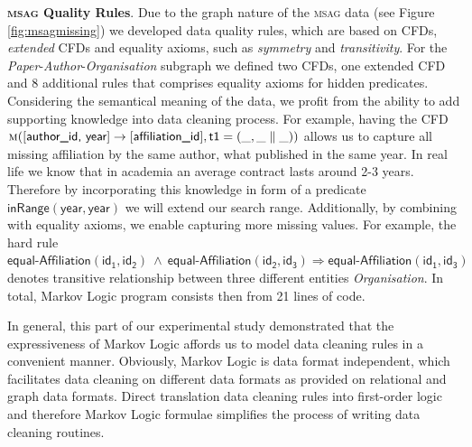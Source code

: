 \textbf{\textsc{msag} Quality Rules}.  
Due to the graph nature of the \textsc{msag} data (see Figure \ref{fig:msagmissing}) we developed data quality rules, which are based on CFDs, \textit{extended} CFDs \cite{Chen2009extended} and equality axioms, such as \textit{symmetry} and \textit{transitivity}. For the \textit{Paper}-\textit{Author}-\textit{Organisation} subgraph we defined two CFDs, one extended CFD and 8 additional rules that comprises equality axioms for hidden predicates. Considering the semantical meaning of the data, we profit from the ability to add supporting knowledge into data cleaning process. For example, having the CFD$\mathsf{\textsc{m}([\textsf{author\_id, year}] \rightarrow [\textsf{affiliation\_id}],t1=(\_,\_ \parallel \_))} $  allows us to capture all missing affiliation by the same author, what published in the same year. In real life we know that in academia an average contract lasts around 2-3 years. Therefore by incorporating this knowledge in form of a predicate $\mathsf{\textsf{inRange}(year, year)}$ we will extend our search range. Additionally, by combining with equality axioms, we enable capturing more missing values. For example, the hard rule $\mathsf{\textsf{equal-Affiliation}(id_1, id_2) ~\wedge~ \textsf{equal-Affiliation}(id_2, id_3) \Rightarrow  \textsf{equal-Affiliation}(id_1, id_3)}$ denotes transitive relationship between three different entities \textit{Organisation}. In total, Markov Logic program consists then from 21 lines of code.

In general, this part of our experimental study demonstrated that the expressiveness of Markov Logic affords us to model data cleaning rules in a convenient manner.  Obviously, Markov Logic is data format independent, which facilitates data cleaning on different data formats as provided on relational and graph data formats. Direct translation data cleaning rules into first-order logic and therefore Markov Logic formulae simplifies the process of writing data cleaning routines. 



